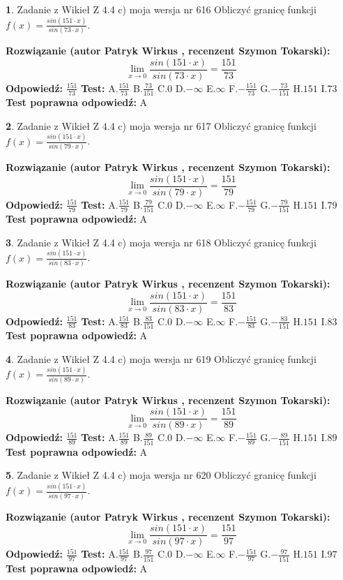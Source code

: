\documentclass[12pt, a4paper]{article}
\theoremstyle{definition} %
\newtheorem{zad}{}
\newcommand{\zadStart}[1]{\begin{zad}#1\newline}
\newcommand{\zadStop}{\end{zad}}
\newcommand{\rozwStart}[2]{\noindent \textbf{Rozwiązanie (autor #1 , recenzent #2): }\newline}
\newcommand{\rozwStop}{\newline}
\newcommand{\odpStart}{\noindent \textbf{Odpowiedź:}\newline}
\newcommand{\odpStop}{\newline}
\newcommand{\testStart}{\noindent \textbf{Test:}\newline}
\newcommand{\testStop}{\newline}
\newcommand{\kluczStart}{\noindent \textbf{Test poprawna odpowiedź:}\newline}
\newcommand{\kluczStop}{\newline}
\begin{document}
\zadStart{Zadanie z Wikieł Z 4.4 c) moja wersja nr 616}
Obliczyć granicę funkcji $f(x)=\frac{sin(151\cdot x)}{sin(73\cdot x)}$.
\zadStop
\rozwStart{Patryk Wirkus}{Szymon Tokarski}
$$\lim\limits_{x\to 0}\frac{sin(151\cdot x)}{sin(73\cdot x)}=
\frac{151}{73}$$
\rozwStop
\odpStart
$\frac{151}{73}$
\odpStop
\testStart
A.$\frac{151}{73}$
B.$\frac{73}{151}$
C.$0$
D.$-\infty$
E.$\infty$
F.$-\frac{151}{73}$
G.$-\frac{73}{151}$
H.$151$
I.$73$
\testStop
\kluczStart
A
\kluczStop



\zadStart{Zadanie z Wikieł Z 4.4 c) moja wersja nr 617}
Obliczyć granicę funkcji $f(x)=\frac{sin(151\cdot x)}{sin(79\cdot x)}$.
\zadStop
\rozwStart{Patryk Wirkus}{Szymon Tokarski}
$$\lim\limits_{x\to 0}\frac{sin(151\cdot x)}{sin(79\cdot x)}=
\frac{151}{79}$$
\rozwStop
\odpStart
$\frac{151}{79}$
\odpStop
\testStart
A.$\frac{151}{79}$
B.$\frac{79}{151}$
C.$0$
D.$-\infty$
E.$\infty$
F.$-\frac{151}{79}$
G.$-\frac{79}{151}$
H.$151$
I.$79$
\testStop
\kluczStart
A
\kluczStop



\zadStart{Zadanie z Wikieł Z 4.4 c) moja wersja nr 618}
Obliczyć granicę funkcji $f(x)=\frac{sin(151\cdot x)}{sin(83\cdot x)}$.
\zadStop
\rozwStart{Patryk Wirkus}{Szymon Tokarski}
$$\lim\limits_{x\to 0}\frac{sin(151\cdot x)}{sin(83\cdot x)}=
\frac{151}{83}$$
\rozwStop
\odpStart
$\frac{151}{83}$
\odpStop
\testStart
A.$\frac{151}{83}$
B.$\frac{83}{151}$
C.$0$
D.$-\infty$
E.$\infty$
F.$-\frac{151}{83}$
G.$-\frac{83}{151}$
H.$151$
I.$83$
\testStop
\kluczStart
A
\kluczStop



\zadStart{Zadanie z Wikieł Z 4.4 c) moja wersja nr 619}
Obliczyć granicę funkcji $f(x)=\frac{sin(151\cdot x)}{sin(89\cdot x)}$.
\zadStop
\rozwStart{Patryk Wirkus}{Szymon Tokarski}
$$\lim\limits_{x\to 0}\frac{sin(151\cdot x)}{sin(89\cdot x)}=
\frac{151}{89}$$
\rozwStop
\odpStart
$\frac{151}{89}$
\odpStop
\testStart
A.$\frac{151}{89}$
B.$\frac{89}{151}$
C.$0$
D.$-\infty$
E.$\infty$
F.$-\frac{151}{89}$
G.$-\frac{89}{151}$
H.$151$
I.$89$
\testStop
\kluczStart
A
\kluczStop



\zadStart{Zadanie z Wikieł Z 4.4 c) moja wersja nr 620}
Obliczyć granicę funkcji $f(x)=\frac{sin(151\cdot x)}{sin(97\cdot x)}$.
\zadStop
\rozwStart{Patryk Wirkus}{Szymon Tokarski}
$$\lim\limits_{x\to 0}\frac{sin(151\cdot x)}{sin(97\cdot x)}=
\frac{151}{97}$$
\rozwStop
\odpStart
$\frac{151}{97}$
\odpStop
\testStart
A.$\frac{151}{97}$
B.$\frac{97}{151}$
C.$0$
D.$-\infty$
E.$\infty$
F.$-\frac{151}{97}$
G.$-\frac{97}{151}$
H.$151$
I.$97$
\testStop
\kluczStart
A
\kluczStop
\end{document}
